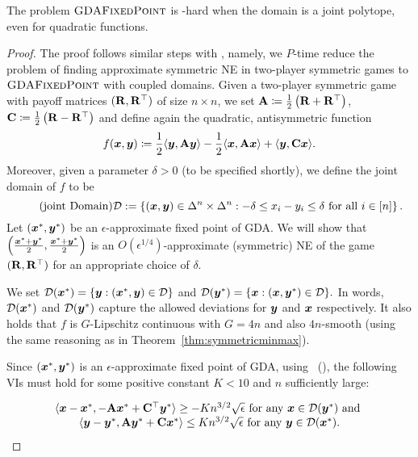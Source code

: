 \begin{theorem}\label{thm:simple} The problem $\textsc{GDAFixedPoint}$ is \PPAD-hard when the domain is a joint polytope, even for quadratic functions.
\end{theorem}
\begin{proof}
The proof follows similar steps with , namely, we $P$-time reduce the problem of finding approximate symmetric NE in two-player symmetric games to $\textsc{GDAFixedPoint}$ with coupled domains.  
Given a two-player symmetric game with payoff matrices $(\mathbf{R},\mathbf{R}^{\top})$ of size $n\times n$, we set 
$\mathbf{A} \coloneqq \frac{1}{2} \left(\mathbf{R}+\mathbf{R}^{\top}\right)$, 
$\mathbf{C} \coloneqq \frac{1}{2}\left(\mathbf{R}-\mathbf{R}^{\top}\right)$ and define again the quadratic, antisymmetric function
\begin{equation*}
 f({\bm{x}},{\bm{y}}) \coloneqq \frac{1}{2} \langle {\bm{y}}, \mathbf{A}{\bm{y}} \rangle - \frac{1}{2} \langle {\bm{x}}, \mathbf{A}{\bm{x}} \rangle + \langle {\bm{y}}, \mathbf{C}{\bm{x}} \rangle.   
\end{equation*}
Moreover, given a parameter $\delta > 0$ (to be specified shortly), we define the joint  domain of $f$ to be
\begin{equation}\label{eq:polytope}\tag{joint Domain}
\mathcal{D} := \left\{({\bm{x}},{\bm{y}}) \in \Delta^n \times \Delta^n: -\delta\leq x_i - y_i \leq \delta \textrm{ for all }i\in[n]\right\}.
\end{equation}
Let $({\bm{x}}^*,{\bm{y}}^*)$ be an $\epsilon$-approximate fixed point of GDA. We will show that $\left(\frac{{\bm{x}}^*+{\bm{y}}^*}{2},\frac{{\bm{x}}^*+{\bm{y}}^*}{2}\right)$ is an $O(\epsilon^{1/4})$-approximate (symmetric) NE of the game $(\mathbf{R},\mathbf{R}^{\top})$ for an appropriate choice of $\delta.$ 

\smallskip

We set $\mathcal{D}({\bm{x}}^*) = \{{\bm{y}}:({\bm{x}}^*,{\bm{y}})\in\mathcal{D}\}$ and 
$\mathcal{D}({\bm{y}}^*) = \{{\bm{x}}:({\bm{x}},{\bm{y}}^*)\in\mathcal{D}\}.$
In words, $\mathcal{D}({\bm{x}}^*)$ and $\mathcal{D}({\bm{y}}^*)$ capture the allowed deviations for ${\bm{y}}$ and ${\bm{x}}$ respectively. It also holds that $f$ is $G$-Lipschitz continuous with $G=4n$ and also $4n$-smooth (using the same reasoning as in Theorem~\ref{thm:symmetricminmax}). 

\smallskip
\noindent Since $({\bm{x}}^*,{\bm{y}}^*)$ is an $\epsilon$-approximate fixed point of GDA, using~ (), the following VIs must hold for some positive constant $K<10$ and $n$ sufficiently large:

\begin{equation}
\label{eq:VIforcoupled}
\begin{array}{cc}
\langle {\bm{x}} - {\bm{x}}^*,-\mathbf{A}{\bm{x}}^*+\mathbf{C}^{\top}{\bm{y}}^*  \rangle \geq -Kn^{3/2}\sqrt{\epsilon} \textrm{ for any }{\bm{x}} \in \mathcal{D}({\bm{y}}^*) \textrm{ and }\\ 
\langle {\bm{y}} - {\bm{y}}^*,\mathbf{A}{\bm{y}}^*+\mathbf{C}{\bm{x}}^*  \rangle \leq Kn^{3/2}\sqrt{\epsilon} \textrm{ for any }{\bm{y}} \in \mathcal{D}({\bm{x}}^*).
\end{array}
\end{equation}


\end{proof}

